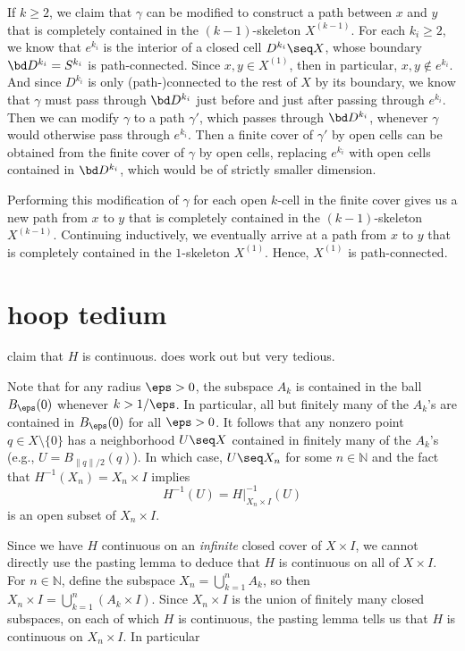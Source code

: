 \documentclass[12pt]{article}
\newcommand{\N}{\mathbb{N}}
\begin{document}
    If $k \geq 2$, we claim that $\gamma$ can be modified to construct a path between $x$ and $y$ that is completely contained in the $(k-1)$-skeleton $X^{(k-1)}$.
    For each $k_i \geq 2$, we know that $e^{k_i}$ is the interior of a closed cell $D^{k_i} \seq X$, whose boundary $\bd D^{k_i} = S^{k_i}$ is path-connected.
    Since $x, y \in X^{(1)}$, then in particular, $x, y \notin e^{k_i}$.
    And since $D^{k_i}$ is only (path-)connected to the rest of $X$ by its boundary, we know that $\gamma$ must pass through $\bd D^{k_i}$ just before and just after passing through $e^{k_i}$.
    Then we can modify $\gamma$ to a path $\gamma'$, which passes through $\bd D^{k_i}$, whenever $\gamma$ would otherwise pass through $e^{k_i}$.
    Then a finite cover of $\gamma'$ by open cells can be obtained from the finite cover of $\gamma$ by open cells, replacing $e^{k_i}$ with open cells contained in $\bd D^{k_i}$, which would be of strictly smaller dimension.

    Performing this modification of $\gamma$ for each open $k$-cell in the finite cover gives us a new path from $x$ to $y$ that is completely contained in the $(k-1)$-skeleton $X^{(k-1)}$.
    Continuing inductively, we eventually arrive at a path from $x$ to $y$ that is completely contained in the $1$-skeleton $X^{(1)}$.
    Hence, $X^{(1)}$ is path-connected.

\section{hoop tedium}

{\color{red} claim that $H$ is continuous. does work out but very tedious.}
    

    Note that for any radius $\eps > 0$, the subspace $A_k$ is contained in the ball $B_\eps(0)$ whenever $k > 1/\eps$.
    In particular, all but finitely many of the $A_k$'s are contained in $B_\eps(0)$ for all $\eps > 0$.
    It follows that any nonzero point $q \in X \setminus \{0\}$ has a neighborhood $U \seq X$ contained in finitely many of the $A_k$'s (e.g., $U = B_{\|q\|/2}(q)$).
    In which case, $U \seq X_n$ for some $n \in \N$ and the fact that $H^{-1}(X_n) = X_n \times I$ implies
    \[
        H^{-1}(U) = H|_{X_n \times I}^{-1}(U)
    \]
    is an open subset of $X_n \times I$.








    Since we have $H$ continuous on an \textit{infinite} closed cover of $X \times I$, we cannot directly use the pasting lemma to deduce that $H$ is continuous on all of $X \times I$.
    For $n \in \N$, define the subspace $X_n = \bigcup_{k=1}^{n} A_k$, so then $X_n \times I = \bigcup_{k=1}^{n} (A_k \times I)$.
    Since $X_n \times I$ is the union of finitely many closed subspaces, on each of which $H$ is continuous, the pasting lemma tells us that $H$ is continuous on $X_n \times I$.
    In particular
\end{document}
